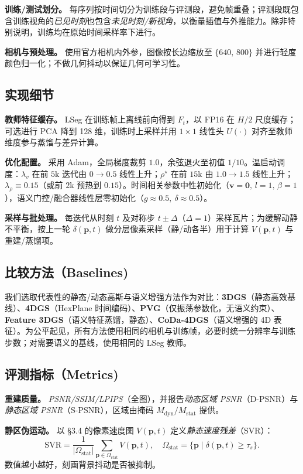 \documentclass[10pt,conference]{IEEEtran} %
\begin{document}
\textbf{训练/测试划分。} 每序列按时间切分为训练段与评测段，避免帧重叠；评测段既包含训练视角的\emph{已见时刻}也包含\emph{未见时刻/新视角}，以衡量插值与外推能力。除非特别说明，训练均在原始时间采样率下进行。

\textbf{相机与预处理。} 使用官方相机内外参，图像按长边缩放至 $\{640,\,800\}$ 并进行轻度颜色归一化；不做几何抖动以保证几何可学习性。

\subsection{实现细节}
\textbf{教师特征缓存。} LSeg 在训练帧上离线前向得到 $F_t$，以 FP16 在 $H/2$ 尺度缓存；可选进行 PCA 降到 128 维，训练时上采样并用 $1{\times}1$ 线性头 $U(\cdot)$ 对齐至教师维度参与蒸馏与差异计算。

\textbf{优化配置。} 采用 Adam，全局梯度裁剪 $1.0$，余弦退火至初值 $1/10$。温启动调度：$\lambda_v$ 在前 $5$k 迭代由 $0\!\to\!0.5$ 线性上升；$\rho^\star$ 在前 $15$k 由 $1.0\!\to\!1.5$ 线性上升；$\lambda_\rho\!\equiv\!0.15$（或前 $2$k 预热到 $0.15$）。时间相关参数中性初始化（$\bm v\!=\!\bm 0,\,l\!=\!1,\,\beta\!=\!1$），语义门控/融合器线性层零初始化（$g\!\approx\!0.5,\ \delta\!\approx\!0.5$）。

\textbf{采样与批处理。} 每迭代从时刻 $t$ 及对称步 $t\!\pm\!\Delta$（$\Delta\!=\!1$）采样瓦片；为缓解动静不平衡，按上一轮 $\delta(\mathbf p,t)$ 做分层像素采样（静/动各半）用于计算 $V(\mathbf p,t)$ 与重建/蒸馏项。

\subsection{比较方法（Baselines)}
我们选取代表性的静态/动态高斯与语义增强方法作为对比：\textbf{3DGS}（静态高效基线）、\textbf{4DGS}（HexPlane 时间编码）、\textbf{PVG}（仅振荡参数化，无语义约束）、\textbf{Feature 3DGS}（语义特征蒸馏，静态）、\textbf{CoDa\mbox{-}4DGS}（语义增强的 4D 表征）。为公平起见，所有方法使用相同的相机与训练帧，必要时统一分辨率与训练步数；对需要语义的基线，使用相同的 LSeg 教师。

\subsection{评测指标（Metrics)}
\textbf{重建质量。} \emph{PSNR/SSIM/LPIPS}（全图），并报告\emph{动态区域 PSNR}（D\mbox{-}PSNR）与\emph{静态区域 PSNR}（S\mbox{-}PSNR），区域由掩码 $M_{\mathrm{dyn}}/M_{\mathrm{stat}}$ 提供。

\textbf{静区伪运动。} 以 §3.4 的像素速度图 $V(\mathbf p,t)$ 定义\emph{静态速度残差}（SVR）：
\[
\mathrm{SVR}=\frac{1}{|\Omega_{\mathrm{stat}}|}\sum_{\mathbf p\in\Omega_{\mathrm{stat}}}V(\mathbf p,t),\quad
\Omega_{\mathrm{stat}}=\{\mathbf p\mid \delta(\mathbf p,t)\ge \tau_s\}.
\]
数值越小越好，刻画背景抖动是否被抑制。
\end{document}
